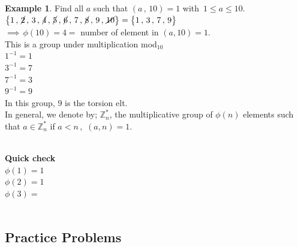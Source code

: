 \documentclass[11pt,a4paper]{article}
\theoremstyle{definition}
\newtheorem{exa}[thm]{Example}
\begin{document}
\begin{exa}
Find all $a$ such that $(a\, , \, 10) = 1$ with $\, 1\leq a\leq 10$.\\

$\big\{1\, , \, \cancel{2}\, , \, 3\, , \, \cancel{4}\, , \, \cancel{5}\, , \, \cancel{6}\, , \, 7\, ,\, \cancel{8}\, , \, 9\, , \, \cancel{10}\big\} = \big\{1\, , \, 3\, , \, 7\, , \, 9\big\}$\\

$\implies\, \phi(10) = 4 = $ number of element in $(a, 10) = 1$.\\

This is  a group under multiplication mod$_{10}$\\

$1^{-1} = 1$\\

$3^{-1} = 7$\\

$7^{-1} = 3$\\

$9^{-1} = 9$\\

In this group, 9 is the torsion elt.\\

In general, we denote by; $\mathbb{Z}^*_n$, the multiplicative group of $\phi(n)$ elements such that $a\in \mathbb{Z}_n^*$ if $a<n\,, \, \, (a,n) = 1$.\\\\
\end{exa}





\textbf{Quick check}\\

$\phi (1) = 1$\\

$\phi(2) = 1$\\

$\phi (3) = $\\\





















\pagebreak

\subsection{Practice Problems}
\end{document}
